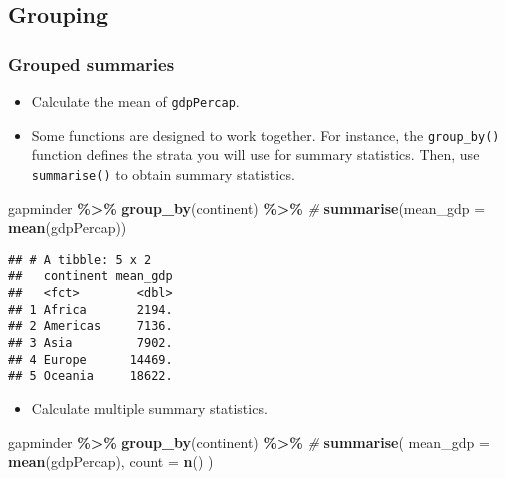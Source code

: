\documentclass[
]{book}
\newenvironment{Shaded}{\begin{snugshade}}{\end{snugshade}}
\newcommand{\CommentTok}[1]{\textcolor[rgb]{0.56,0.35,0.01}{\textit{#1}}}
\newcommand{\DataTypeTok}[1]{\textcolor[rgb]{0.13,0.29,0.53}{#1}}
\newcommand{\KeywordTok}[1]{\textcolor[rgb]{0.13,0.29,0.53}{\textbf{#1}}}
\newcommand{\NormalTok}[1]{#1}
\newcommand{\OperatorTok}[1]{\textcolor[rgb]{0.81,0.36,0.00}{\textbf{#1}}}
\newcommand{\StringTok}[1]{\textcolor[rgb]{0.31,0.60,0.02}{#1}}
\providecommand{\tightlist}{%
  \setlength{\itemsep}{0pt}\setlength{\parskip}{0pt}}
\begin{document}
\hypertarget{grouping}{%
\subsection{Grouping}\label{grouping}}

\hypertarget{grouped-summaries}{%
\subsubsection{Grouped summaries}\label{grouped-summaries}}

\begin{itemize}
\item
  Calculate the mean of \texttt{gdpPercap}.
\item
  Some functions are designed to work together. For instance, the \texttt{group\_by()} function defines the strata you will use for summary statistics. Then, use \texttt{summarise()} to obtain summary statistics.
\end{itemize}

\begin{Shaded}
\begin{Highlighting}[]
\NormalTok{gapminder }\OperatorTok{\%\textgreater{}\%}
\StringTok{  }\KeywordTok{group\_by}\NormalTok{(continent) }\OperatorTok{\%\textgreater{}\%}\StringTok{ }\CommentTok{\#}
\StringTok{  }\KeywordTok{summarise}\NormalTok{(}\DataTypeTok{mean\_gdp =} \KeywordTok{mean}\NormalTok{(gdpPercap))}
\end{Highlighting}
\end{Shaded}

\begin{verbatim}
## # A tibble: 5 x 2
##   continent mean_gdp
##   <fct>        <dbl>
## 1 Africa       2194.
## 2 Americas     7136.
## 3 Asia         7902.
## 4 Europe      14469.
## 5 Oceania     18622.
\end{verbatim}

\begin{itemize}
\tightlist
\item
  Calculate multiple summary statistics.
\end{itemize}

\begin{Shaded}
\begin{Highlighting}[]
\NormalTok{gapminder }\OperatorTok{\%\textgreater{}\%}
\StringTok{  }\KeywordTok{group\_by}\NormalTok{(continent) }\OperatorTok{\%\textgreater{}\%}\StringTok{ }\CommentTok{\#}
\StringTok{  }\KeywordTok{summarise}\NormalTok{(}
    \DataTypeTok{mean\_gdp =} \KeywordTok{mean}\NormalTok{(gdpPercap),}
    \DataTypeTok{count =} \KeywordTok{n}\NormalTok{()}
\NormalTok{  )}
\end{Highlighting}
\end{Shaded}
\end{document}
